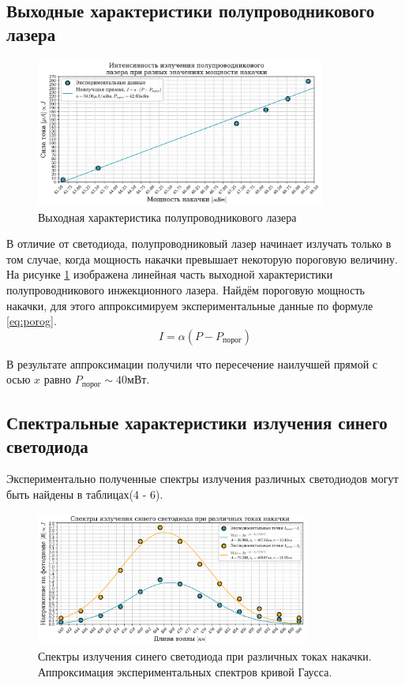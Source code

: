 \documentclass[a4paper, 12pt]{extarticle}
\begin{document}
\subsection*{\textcolor{sub_header}{Выходные характеристики полупроводникового лазера}}



\begin{figure}[htbp]
    \centering
    \includegraphics[width = 0.85\textwidth]{lazer.png}
    \caption{Выходная характеристика полупроводникового лазера}
    \label{fig:lazer}
\end{figure}

В отличие от светодиода, полупроводниковый лазер начинает излучать только в том случае, когда мощность накачки превышает некоторую пороговую величину. На рисунке \ref{fig:lazer} изображена линейная часть выходной характеристики полупроводникового инжекционного лазера. Найдём пороговую мощность накачки, для этого аппроксимируем экспериментальные данные по формуле \ref{eq:porog}.
\begin{equation}
    I = \alpha (P - P_{\text{порог}}) 
    \label{eq:porog}
\end{equation}

В результате аппроксимации получили что пересечение наилучшей прямой с осью $x$ равно $P_{\text{порог}} \sim 40 \text{мВт}$.


\subsection*{\textcolor{sub_header}{Спектральные характеристики излучения синего светодиода}}
 

Экспериментально полученные спектры излучения различных светодиодов могут быть найдены в таблицах(4 - 6).
\begin{figure}[htbp]
    \centering
    \includegraphics[width = 0.8\textwidth]{blue_gauss.png}
    \caption{Спектры излучения синего светодиода при различных токах накачки. Аппроксимация экспериментальных спектров кривой Гаусса.}
    \label{fig:blue_gauss}
\end{figure}
\end{document}
